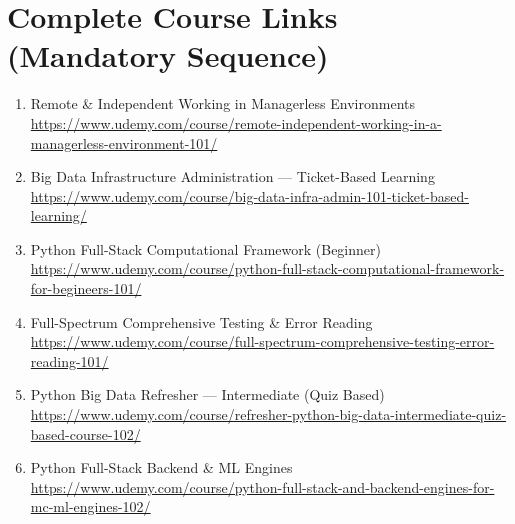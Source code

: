 \documentclass[12pt]{article}
\begin{document}
	\newpage
	
	\section*{Complete Course Links (Mandatory Sequence)}
	
	\begin{enumerate}[label=\textbf{Course \arabic*:}]
		\item Remote \& Independent Working in Managerless Environments \\
		\href{https://www.udemy.com/course/remote-independent-working-in-a-managerless-environment-101/}
		{https://www.udemy.com/course/remote-independent-working-in-a-managerless-environment-101/}
		
		\item Big Data Infrastructure Administration — Ticket-Based Learning \\
		\href{https://www.udemy.com/course/big-data-infra-admin-101-ticket-based-learning/}
		{https://www.udemy.com/course/big-data-infra-admin-101-ticket-based-learning/}
		
		\item Python Full-Stack Computational Framework (Beginner) \\
		\href{https://www.udemy.com/course/python-full-stack-computational-framework-for-begineers-101/}
		{https://www.udemy.com/course/python-full-stack-computational-framework-for-begineers-101/}
		
		\item Full-Spectrum Comprehensive Testing \& Error Reading \\
		\href{https://www.udemy.com/course/full-spectrum-comprehensive-testing-error-reading-101/}
		{https://www.udemy.com/course/full-spectrum-comprehensive-testing-error-reading-101/}
		
		\item Python Big Data Refresher — Intermediate (Quiz Based) \\
		\href{https://www.udemy.com/course/refresher-python-big-data-intermediate-quiz-based-course-102/}
		{https://www.udemy.com/course/refresher-python-big-data-intermediate-quiz-based-course-102/}
		
		\item Python Full-Stack Backend \& ML Engines \\
		\href{https://www.udemy.com/course/python-full-stack-and-backend-engines-for-mc-ml-engines-102/}
		{https://www.udemy.com/course/python-full-stack-and-backend-engines-for-mc-ml-engines-102/}
		

\end{enumerate}
\end{document}

